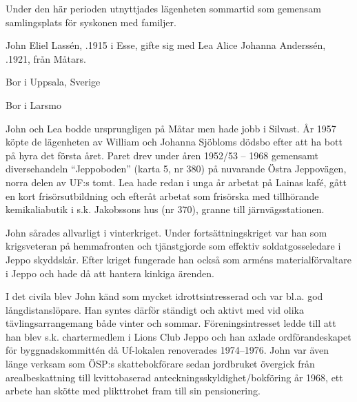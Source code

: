 %
Under den här perioden utnyttjades lägenheten sommartid som gemensam samlingsplats för syskonen med familjer.\jhvspace{}


%
John Eliel Lassén, .1915 i Esse, gifte sig med Lea Alice Johanna Anderssén, .1921, från Måtars.
\begin{jhchildren}
  \item {} Bor i Uppsala, Sverige
  \item {} Bor i Larsmo
  \item {}
  \item {}
  \item {}
\end{jhchildren}

John och Lea bodde ursprungligen på Måtar men hade jobb i Silvast. År 1957 köpte de lägenheten av William och Johanna Sjöbloms dödsbo efter att ha bott på hyra det första året. Paret drev under åren 1952/53 -- 1968 gemensamt diversehandeln ``Jeppoboden'' (karta 5, nr 380) på nuvarande Östra Jeppovägen, norra delen av UF:s tomt. Lea hade redan i unga år arbetat på Lainas kafé, gått en kort frisörsutbildning och efteråt arbetat som frisörska med tillhörande kemikaliabutik i s.k. Jakobssons hus (nr 370), granne till järnvägsstationen.

John sårades allvarligt i vinterkriget. Under fortsättningskriget var han som krigsveteran på hemmafronten och tjänstgjorde som effektiv soldatgosseledare i Jeppo skyddskår. Efter kriget fungerade han också som arméns materialförvaltare i Jeppo och hade då att hantera kinkiga ärenden.

I det civila blev John känd som mycket idrottsintresserad och var bl.a. god långdistanslöpare. Han syntes därför ständigt och aktivt med vid olika tävlingsarrangemang både vinter och sommar. Föreningsintresset ledde till att han blev s.k. chartermedlem i Lions Club Jeppo och han axlade ordförandeskapet för byggnadskommittén då Uf-lokalen renoverades 1974--1976. John var även länge verksam som ÖSP:s skattebokförare sedan jordbruket övergick från arealbeskattning till kvittobaserad anteckningsskyldighet/bokföring år 1968, ett arbete han skötte med plikttrohet fram till sin pensionering.

